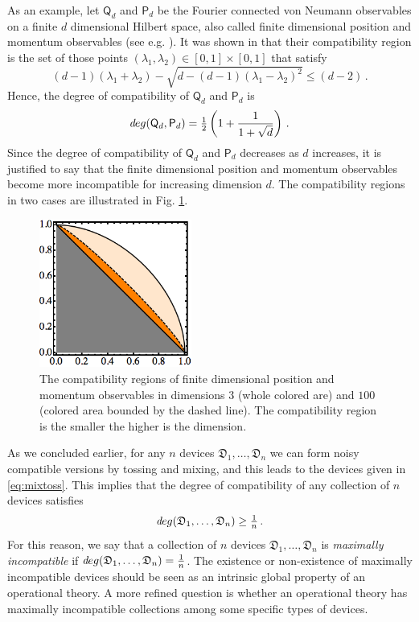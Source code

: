 \documentclass[12pt]{article}
\theoremstyle{definition}
\newcommand{\half}{\tfrac{1}{2}} %
\newcommand{\Po}{\mathsf{P}}%
\newcommand{\Qo}{\mathsf{Q}}%
\newcommand{\Dev}{\mathfrak{D}} %
\def\deg{\textit deg}
\begin{document}
As an example, let $\Qo_d$ and $\Po_d$ be the Fourier connected von Neumann observables on a finite $d$ dimensional Hilbert space, also called  finite dimensional position and momentum observables (see e.g. \cite{Vourdas97}).
It was shown in \cite{CaHeTo12} that their compatibility region is the set of those points $(\lambda_1,\lambda_2)\in [0,1]\times[0,1]$ that satisfy
\begin{equation}\label{eq:lambda}
(d-1) (\lambda_1 + \lambda_2) -  \sqrt{d  - (d-1) (\lambda_1 - \lambda_2)^2}\leq (d-2) \, .
\end{equation}
Hence, the degree of compatibility of $\Qo_d$ and $\Po_d$ is
\begin{equation}\label{eq:pos-mom}
\deg(\Qo_d,\Po_d) = \half \left( 1 + \frac{1}{1+\sqrt{d}} \right) \, .
\end{equation}
Since the degree of compatibility of $\Qo_d$ and $\Po_d$ decreases as $d$ increases, it is justified to say that the finite dimensional position and momentum observables become more incompatible for increasing dimension $d$.
The compatibility regions in two cases are illustrated in Fig. \ref{fig:dim}.

\begin{figure}\begin{center}
\includegraphics[width=5cm]{fig_regiondim.png}
\caption{The compatibility regions of finite dimensional position and momentum observables in dimensions $3$ (whole colored are) and $100$ (colored area bounded by the dashed line).
The compatibility region is the smaller the higher is the dimension.}
\label{fig:dim}
\end{center}
\end{figure}
 
As we concluded earlier, for any $n$ devices $\Dev_1,\ldots,\Dev_n$ we can form noisy compatible versions by tossing and mixing, and this leads to the devices given in \eqref{eq:mixtoss}.
This implies that the degree of compatibility of any collection of $n$ devices satisfies 
\begin{equation}
\deg(\Dev_1,\ldots,\Dev_n) \geq \tfrac{1}{n} \, .
\end{equation}
For this reason, we say that a collection of $n$ devices $\Dev_1,\ldots,\Dev_n$ is \emph{maximally incompatible} if $\deg(\Dev_1,\ldots,\Dev_n) = \tfrac{1}{n}$. 
The existence or non-existence of maximally incompatible devices should be seen as an intrinsic global property of an operational theory. 
A more refined question is whether an operational theory has maximally incompatible collections among some specific types of devices. 
\end{document}
